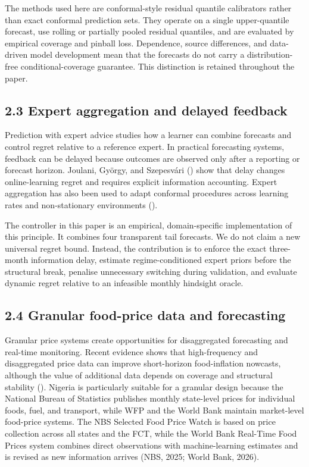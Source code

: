 The methods used here are conformal-style residual quantile calibrators
rather than exact conformal prediction sets. They operate on a single
upper-quantile forecast, use rolling or partially pooled residual
quantiles, and are evaluated by empirical coverage and pinball loss.
Dependence, source differences, and data-driven model development mean
that the forecasts do not carry a distribution-free conditional-coverage
guarantee. This distinction is retained throughout the paper.

\subsection{2.3 Expert aggregation and delayed
feedback}\label{expert-aggregation-and-delayed-feedback}

Prediction with expert advice studies how a learner can combine
forecasts and control regret relative to a reference expert. In
practical forecasting systems, feedback can be delayed because outcomes
are observed only after a reporting or forecast horizon. Joulani,
György, and Szepesvári () show
that delay changes online-learning regret and requires explicit
information accounting. Expert aggregation has also been used to adapt
conformal procedures across learning rates and non-stationary
environments ().

The controller in this paper is an empirical, domain-specific
implementation of this principle. It combines four transparent tail
forecasts. We do not claim a new universal regret bound. Instead, the
contribution is to enforce the exact three-month information delay,
estimate regime-conditioned expert priors before the structural break,
penalise unnecessary switching during validation, and evaluate dynamic
regret relative to an infeasible monthly hindsight oracle.

\subsection{2.4 Granular food-price data and
forecasting}\label{granular-food-price-data-and-forecasting}

Granular price systems create opportunities for disaggregated
forecasting and real-time monitoring. Recent evidence shows that
high-frequency and disaggregated price data can improve short-horizon
food-inflation nowcasts, although the value of additional data depends
on coverage and structural stability (). Nigeria is particularly suitable for a granular
design because the National Bureau of Statistics publishes monthly
state-level prices for individual foods, fuel, and transport, while WFP
and the World Bank maintain market-level food-price systems. The NBS
Selected Food Price Watch is based on price collection across all states
and the FCT, while the World Bank Real-Time Food Prices system combines
direct observations with machine-learning estimates and is revised as
new information arrives (NBS, 2025; World Bank, 2026).

